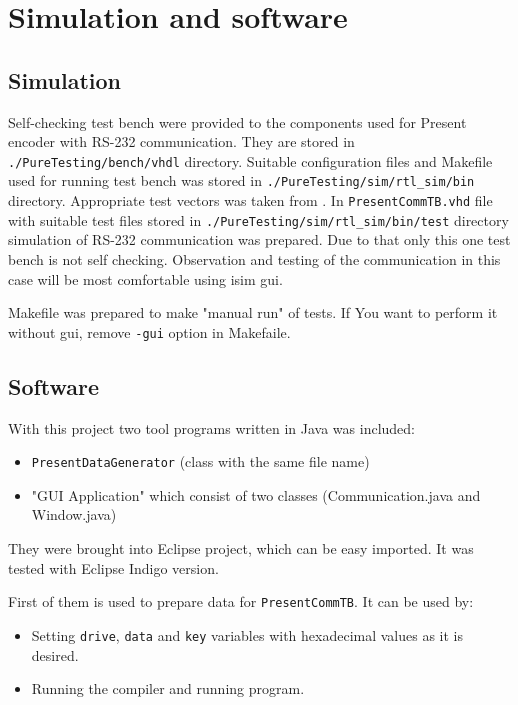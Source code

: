 \documentclass{gajewski}
\begin{document}

\newpage

\section{Simulation and software}

\subsection{Simulation}

Self-checking test bench were provided to the components used for Present encoder with RS-232 communication. They are stored in \texttt{./PureTesting/bench/vhdl} directory. Suitable configuration files and Makefile used for running test bench was stored in 
\texttt{./PureTesting/sim/rtl\_sim/bin} directory. Appropriate test vectors was taken from \cite{PRESENT}. In \texttt{PresentCommTB.vhd} file with suitable test files stored in \texttt{./PureTesting/sim/rtl\_sim/bin/test} directory simulation of RS-232 communication was prepared. Due to that only this one test bench is not self checking. Observation and testing of the communication in this case will be most comfortable using isim gui.

Makefile was prepared to make "manual run" of tests. If You want to perform it without gui, remove \texttt{-gui} option in Makefaile.

\subsection{Software}

With this project two tool programs written in Java was included:
\begin{itemize}
    \item \texttt{PresentDataGenerator} (class with the same file name)
    \item "GUI Application" which consist of two classes (Communication.java and Window.java)
\end{itemize}
They were brought into Eclipse project, which can be easy imported. It was tested with Eclipse Indigo version.

First of them is used to prepare data for \texttt{PresentCommTB}. It can be used by:
\begin{itemize}
    \item Setting \texttt{drive}, \texttt{data} and \texttt{key} variables with hexadecimal values as it is desired.
    \item Running the compiler and running program.
\end{itemize}
\end{document}
